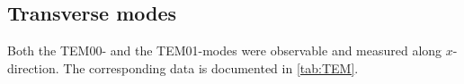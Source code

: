 \subsection{Transverse modes}
Both the TEM00- and the TEM01-modes were observable and measured along $x$-direction. 
The corresponding data is documented in \autoref{tab:TEM}. 





